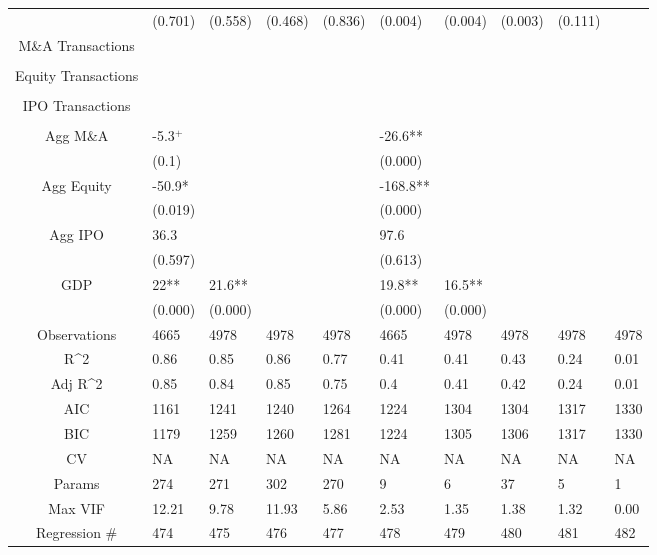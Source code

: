 \documentclass{article}
\begin{document}
\begin{table}[H]
\begin{tabular}{|clllllllll|}
   & (0.701) & (0.558) & (0.468) & (0.836) & (0.004) & (0.004) & (0.003) & (0.111) &  \\ 
  M\&A Transactions &  &  &  &  &  &  &  &  &  \\ 
   &  &  &  &  &  &  &  &  &  \\ 
  Equity Transactions &  &  &  &  &  &  &  &  &  \\ 
   &  &  &  &  &  &  &  &  &  \\ 
  IPO Transactions &  &  &  &  &  &  &  &  &  \\ 
   &  &  &  &  &  &  &  &  &  \\ 
  Agg M\&A & -5.3$^{+}$ &  &  &  & -26.6** &  &  &  &  \\ 
   & (0.1) &  &  &  & (0.000) &  &  &  &  \\ 
  Agg Equity & -50.9* &  &  &  & -168.8** &  &  &  &  \\ 
   & (0.019) &  &  &  & (0.000) &  &  &  &  \\ 
  Agg IPO & 36.3 &  &  &  & 97.6 &  &  &  &  \\ 
   & (0.597) &  &  &  & (0.613) &  &  &  &  \\ 
  GDP & 22** & 21.6** &  &  & 19.8** & 16.5** &  &  &  \\ 
   & (0.000) & (0.000) &  &  & (0.000) & (0.000) &  &  &  \\ 
  \hline 
 Observations & 4665 & 4978 & 4978 & 4978 & 4665 & 4978 & 4978 & 4978 & 4978 \\ 
  R^2 & 0.86 & 0.85 & 0.86 & 0.77 & 0.41 & 0.41 & 0.43 & 0.24 & 0.01 \\ 
  Adj R^2 & 0.85 & 0.84 & 0.85 & 0.75 & 0.4 & 0.41 & 0.42 & 0.24 & 0.01 \\ 
  AIC & 1161 & 1241 & 1240 & 1264 & 1224 & 1304 & 1304 & 1317 & 1330 \\ 
  BIC & 1179 & 1259 & 1260 & 1281 & 1224 & 1305 & 1306 & 1317 & 1330 \\ 
  CV & NA & NA & NA & NA & NA & NA & NA & NA & NA \\ 
  Params & 274 & 271 & 302 & 270 & 9 & 6 & 37 & 5 & 1 \\ 
  Max VIF & 12.21 & 9.78 & 11.93 & 5.86 & 2.53 & 1.35 & 1.38 & 1.32 & 0.00 \\ 
  Regression \# & 474 & 475 & 476 & 477 & 478 & 479 & 480 & 481 & 482 \\ 
   \hline
\end{tabular}
 
\end{table}
\end{document}

